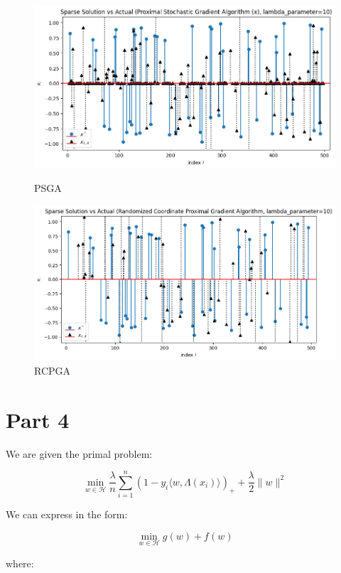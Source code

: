 \documentclass[12pt]{article}
\begin{document}
\begin{figure}[h]
\centering
\begin{minipage}{.5\textwidth}
  \centering
\includegraphics[scale=0.4]{outputs/part_3/psga-x}
\caption{PSGA}
\label{fig:}
\end{minipage}%
\begin{minipage}{.5\textwidth}
  \centering
\includegraphics[scale=0.4]{outputs/part_3/rcpga-x}
\caption{RCPGA}
\label{fig:}
\end{minipage}
\end{figure}


\newpage
\section*{Part 4}

We are given the primal problem:

\[\min_{w \in \mathcal{H}} \frac{\lambda}{n} \sum_{i=1}^{n} (1-y_i \langle w, \Lambda(x_i)\rangle)_{+} + \frac{\lambda}{2}\| w\|^2\]

We can express in the form:

\[\min_{w \in \mathcal{H}} g(w) + f(w)\]

where:
\end{document}
